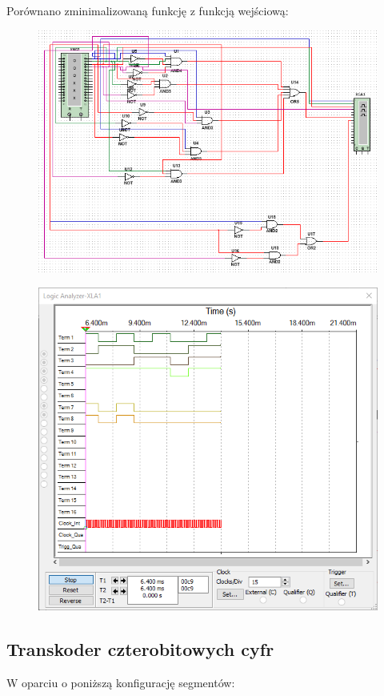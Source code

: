 \documentclass[12pt,a4paper]{article}
\begin{document}
Porównano zminimalizowaną funkcję z funkcją wejściową:

\begin{figure}[H]
\includegraphics[width=\textwidth]{upro2b}
\end{figure}

\begin{figure}[H]
\includegraphics[width=\textwidth]{upro2bwyk}
\end{figure}

\newpage
\subsection{Transkoder czterobitowych cyfr}
W oparciu o poniższą konfigurację segmentów:
\end{document}
